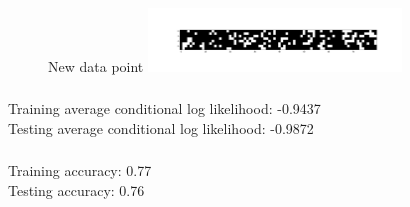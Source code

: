 \documentclass[12pt,letterpaper]{article} %
\begin{document}
\subsubsection{}
 \begin{figure}[!h]
  \centering
  \caption{}{ New data point }
   \includegraphics[width=0.6\textwidth, trim={3in 0in 0in 0in},clip=true ]{q2_3_new.png}
\end{figure}
\FloatBarrier

\subsubsection{}
 Training average conditional log likelihood: -0.9437 \\
  Testing average conditional log likelihood: -0.9872\\
  \subsubsection{}
  Training accuracy: 0.77\\
  Testing accuracy: 0.76
\end{document}
